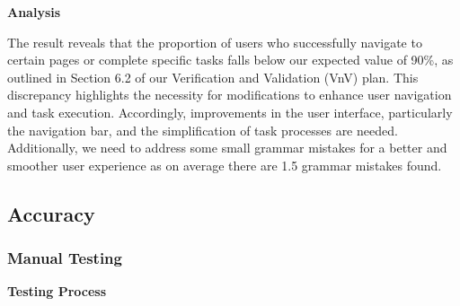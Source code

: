\documentclass[12pt, titlepage]{article}
\begin{document}
\noindent \textbf{Analysis}

\noindent The result reveals that the proportion of users who successfully navigate to certain pages or complete specific tasks falls below our expected value of 90\%, as outlined in Section 6.2 of our Verification and Validation (VnV) plan. This discrepancy highlights the necessity for modifications to enhance user navigation and task execution. Accordingly, improvements in the user interface, particularly the navigation bar, and the simplification of task processes are needed. Additionally, we need to address some small grammar mistakes for a better and smoother user experience as on average there are 1.5 grammar mistakes found.


\subsection{Accuracy}
\subsubsection{Manual Testing}

\textbf{Testing Process} \\
\end{document}
